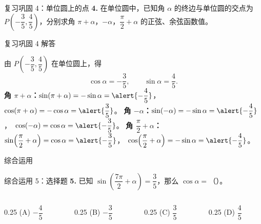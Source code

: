 \documentclass[10pt,aspectratio=169,serif]{beamer}
\begin{document}
\begin{frame}[t]{复习巩固 4：单位圆上的点}
\textbf{4.} 在单位圆中，已知角 $\alpha$ 的终边与单位圆的交点为 $P\!\left(-\dfrac35,\dfrac45\right)$，分别求角 $\pi+\alpha$，$-\alpha$，$\dfrac{\pi}{2}+\alpha$ 的正弦、余弦函数值。
\vspace{1em}
\begin{center}
\end{center}
\end{frame}

\begin{frame}[t]{复习巩固 4 解答}
\begin{tcolorbox}[colback=orange!10,colframe=orange,title=\textbf{解}]
由 $P\!\left(-\dfrac35,\dfrac45\right)$ 在单位圆上，得
\[
\cos\alpha=-\frac35,\qquad \sin\alpha=\frac45.
\]
\vspace{0.3em}
\textbf{角 $\pi+\alpha$：}\quad $\sin(\pi+\alpha)=-\sin\alpha=\alert{-\dfrac45}$，\ $\cos(\pi+\alpha)=-\cos\alpha=\alert{\dfrac35}$。
\vspace{0.3em}
\textbf{角 $-\alpha$：}\quad $\sin(-\alpha)=-\sin\alpha=\alert{-\dfrac45}$，\ $\cos(-\alpha)=\cos\alpha=\alert{-\dfrac35}$。
\vspace{0.3em}
\textbf{角 $\dfrac{\pi}{2}+\alpha$：}\quad $\sin\!\left(\dfrac{\pi}{2}+\alpha\right)=\cos\alpha=\alert{-\dfrac35}$，\ $\cos\!\left(\dfrac{\pi}{2}+\alpha\right)=-\sin\alpha=\alert{-\dfrac45}$。
\end{tcolorbox}
\end{frame}

\begin{frame}[c]\Huge\centering 综合运用\end{frame}

\begin{frame}[t]{综合运用 5：选择题}
\textbf{5.} 已知 $\sin\!\left(\dfrac{7\pi}{2}+\alpha\right)=\dfrac35$，那么 $\cos\alpha=$（\quad ）。

\vspace{1em}
\begin{columns}
\begin{column}{0.25\textwidth}
(A) $-\dfrac45$
\end{column}
\begin{column}{0.25\textwidth}
(B) $-\dfrac35$
\end{column}
\begin{column}{0.25\textwidth}
(C) $\dfrac35$
\end{column}
\begin{column}{0.25\textwidth}
(D) $\dfrac45$
\end{column}
\end{columns}
\end{frame}
\end{document}

